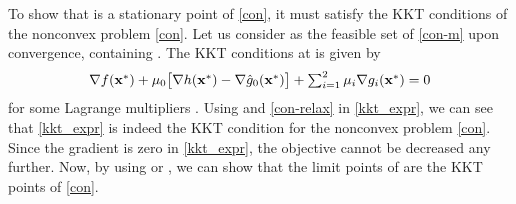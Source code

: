 To show that \eqn{\ma^{\ast}} is a stationary point of \eqref{con}, it must satisfy the \ac{KKT} conditions of the nonconvex problem \eqref{con}. Let us consider  as the feasible set of \eqref{con-m} upon convergence, containing \eqn{\ma^{\ast}}. The \ac{KKT} conditions at \eqn{\ma^{\ast}} is given by
\begin{equation} \label{kkt_expr}
\textstyle	\nabla f(\ma^{\ast}) + \mu_0 \big [ \nabla h(\ma^{\ast}) - \nabla\hat{g}_0(\ma^{\ast}) \big ] + \sum_{i=1}^2 \mu_i \nabla g_i(\ma^{\ast}) = 0
\end{equation}
for some Lagrange multipliers . Using  and \eqref{con-relax} in \eqref{kkt_expr}, we can see that \eqref{kkt_expr} is indeed the \ac{KKT} condition for the nonconvex problem \eqref{con}. Since the gradient is zero in \eqref{kkt_expr}, the objective cannot be decreased any further. Now, by using \cite[Th. 2 and 11]{scutari_1} or \cite[Prop. 3.2]{amir}, we can show that the limit points \eqn{\ma^\ast} of  are the \ac{KKT} points of \eqref{con}.



